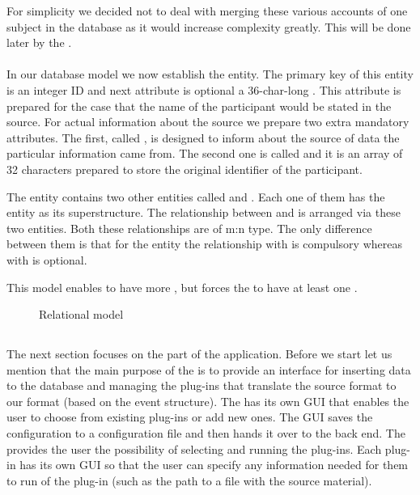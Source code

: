 For simplicity we decided not to deal with merging these various accounts of one subject in the database as it would increase complexity greatly. This will be done later by the . 

\paragraph{}
In our database model we now establish the  entity. The primary key of this entity is an integer ID and next attribute is optional a 36-char-long . This attribute is prepared for the case that the name of the participant would be stated in the source. For actual information about the source we prepare two extra mandatory attributes. The first, called , is designed to inform about the source of data the particular information came from. The second one is called  and it is an array of 32 characters prepared to store the original identifier of the participant.

The  entity contains two other entities called  and . Each one of them has the entity  as its superstructure. The relationship between  and  is arranged via these two entities. Both these relationships are of m:n type. The only difference between them is that  for the  entity the relationship with  is compulsory whereas with  is optional. 

This model enables  to have more , but forces the  to have at least one .


\begin{figure}[!h]
    \centering 
    
    \epsfysize=180mm 
    \caption{Relational model}\label{Relational}
\end{figure}

\subsection{} 

The next section focuses on the  part of the application. Before we start let us mention that the main purpose of the  is to provide an interface for inserting data to the database and managing the plug-ins that translate the source format to our format (based on the event structure). The  has its own GUI that enables the user to choose from existing plug-ins or add new ones. The GUI saves the configuration to a configuration file and then hands it over to the  back end. The  provides the user the possibility of selecting and running the plug-ins. Each plug-in has its own GUI so that the user can specify any information needed for them to run of the plug-in (such as the path to a file with the source material). 

